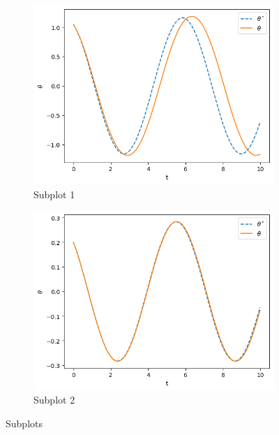 \documentclass{article}
\begin{document}
\begin{figure}[htbp]
    \centering
    \begin{subfigure}[b]{0.47\textwidth}
        \centering
        \includegraphics[width=\textwidth]{demo2-1.png}
        \caption{Subplot 1}
        \label{fig:demo2-a}
    \end{subfigure}
    \begin{subfigure}[b]{0.47\textwidth}
        \centering
        \includegraphics[width=\textwidth]{demo2-2.png}
        \caption{Subplot 2}
        \label{fig:demo2-b}
    \end{subfigure}
    \caption{Subplots}
    \label{fig:demo2}
\end{figure}
\end{document}
